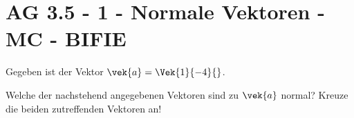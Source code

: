\section{AG 3.5 - 1 - Normale Vektoren - MC - BIFIE}

\begin{beispiel}[AG 3.5]{1} %
Gegeben ist der Vektor $\vek{a}=\Vek{1}{-4}{}$.

Welche der nachstehend angegebenen Vektoren sind zu $\vek{a}$ normal?
Kreuze die beiden zutreffenden Vektoren an!
\end{beispiel}